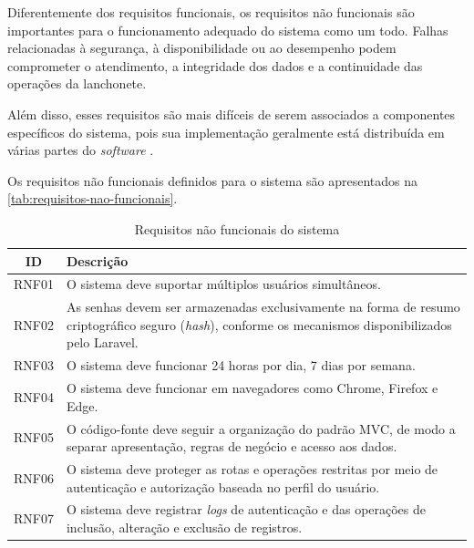 Diferentemente dos requisitos funcionais, os requisitos não funcionais são importantes para o funcionamento adequado do sistema como um todo. Falhas relacionadas à segurança, à disponibilidade ou ao desempenho podem comprometer o atendimento, a integridade dos dados e a continuidade das operações da lanchonete.

Além disso, esses requisitos são mais difíceis de serem associados a componentes específicos do sistema, pois sua implementação geralmente está distribuída em várias partes do \textit{software} \cite{Sommerville2011}.

Os requisitos não funcionais definidos para o sistema são apresentados na \autoref{tab:requisitos-nao-funcionais}.

\begin{table}[htbp]
\centering
\caption{Requisitos não funcionais do sistema}
\label{tab:requisitos-nao-funcionais}
\small

\begin{tabularx}{\textwidth}{c X}
\hline
\textbf{ID} & \textbf{Descrição} \\
\hline
RNF01 & O sistema deve suportar múltiplos usuários simultâneos. \\
\hline
RNF02 & As senhas devem ser armazenadas exclusivamente na forma de resumo criptográfico seguro (\textit{hash}), conforme os mecanismos disponibilizados pelo Laravel. \\
\hline
RNF03 & O sistema deve funcionar 24 horas por dia, 7 dias por semana. \\
\hline
RNF04 & O sistema deve funcionar em navegadores como Chrome, Firefox e Edge. \\
\hline
RNF05 & O código-fonte deve seguir a organização do padrão MVC, de modo a separar apresentação, regras de negócio e acesso aos dados. \\
\hline
RNF06 & O sistema deve proteger as rotas e operações restritas por meio de autenticação e autorização baseada no perfil do usuário. \\
\hline
RNF07 & O sistema deve registrar \textit{logs} de autenticação e das operações de inclusão, alteração e exclusão de registros. \\
\hline
\end{tabularx}

\end{table}
